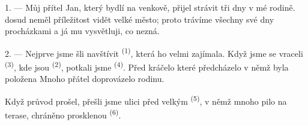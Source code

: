 %
%

\VUsaut{4.0mm}
\VUsaut{3.0mm}

\VUsaut{3.0mm}

1. --- Můj přítel Jan, který bydlí na venkově, přijel strávit tři dny v mé rodině.
 dosud neměl příležitost vidět velké město; proto trávíme všechny své dny
procházkami a já mu vysvětluji, co nezná.

2. --- Nejprve jsme šli navštívit  \textsuperscript{(1)}, která ho velmi
zajímala. Když jsme se vraceli  \textsuperscript{(3)}, kde jsou
 \textsuperscript{(2)}, potkali jsme 
\textsuperscript{(4)}. Před  kráčelo  které
předcházelo  v němž byla položena  Mnoho přátel
doprovázelo  rodinu.

Když průvod prošel, přešli jsme ulici před velkým 
\textsuperscript{(5)}, v němž mnoho  pilo  na terase, chráněno
prosklenou  \textsuperscript{(6)}.

